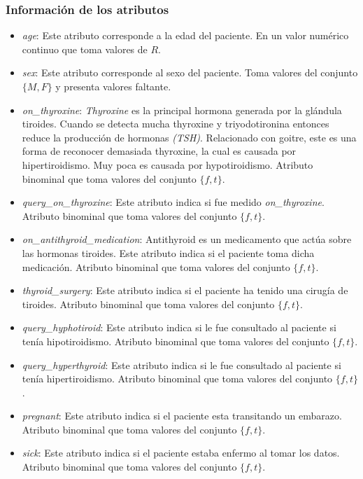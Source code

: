 \documentclass[osajnl,twocolumn,showpacs,superscriptaddress,10pt,floatfix]{revtex4-1} %
\begin{document}
\subsubsection{Información de los atributos}

\begin{itemize}
    \item \textit{age}: Este atributo corresponde a la edad del paciente. En un valor numérico continuo que toma valores de $R$.
    \item \textit{sex}: Este atributo corresponde al sexo del paciente. Toma valores del conjunto $\{M, F\}$ y presenta valores faltante.
    \item \textit{on\_thyroxine}:  \textit{Thyroxine} es la principal hormona generada por la glándula tiroides. Cuando se detecta mucha thyroxine y triyodotironina entonces reduce la producción de hormonas \textit{(TSH)}. Relacionado con goitre, este es una forma de reconocer demasiada thyroxine, la cual es causada por hipertiroidismo. Muy poca es causada por hypotiroidismo. Atributo binominal que toma valores del conjunto $\{f, t\}$.
    \item \textit{query\_on\_thyroxine}: Este atributo indica si fue medido \textit{on\_thyroxine}. Atributo binominal que toma valores del conjunto $\{f, t\}$.
    \item \textit{on\_antithyroid\_medication}: Antithyroid es un medicamento que actúa sobre las hormonas tiroides. Este atributo indica si el paciente toma dicha medicación. Atributo binominal que toma valores del conjunto $\{f, t\}$.
    \item \textit{thyroid\_surgery}: Este atributo indica si el paciente ha tenido una cirugía de tiroides. Atributo binominal que toma valores del conjunto $\{f, t\}$.
    \item \textit{query\_hyphotiroid}: Este atributo indica si le fue consultado al paciente si tenía hipotiroidismo. Atributo binominal que toma valores del conjunto $\{f, t\}$.
    \item \textit{query\_hyperthyroid}: Este atributo indica si le fue consultado al paciente si tenía hipertiroidismo. Atributo binominal que toma valores del conjunto $\{f, t\}$.
    \item \textit{pregnant}: Este atributo indica si el paciente esta transitando un embarazo. Atributo binominal que toma valores del conjunto $\{f, t\}$.
    \item \textit{sick}: Este atributo indica si el paciente estaba enfermo al tomar los datos. Atributo binominal que toma valores del conjunto $\{f, t\}$.

\end{itemize}
\end{document}
